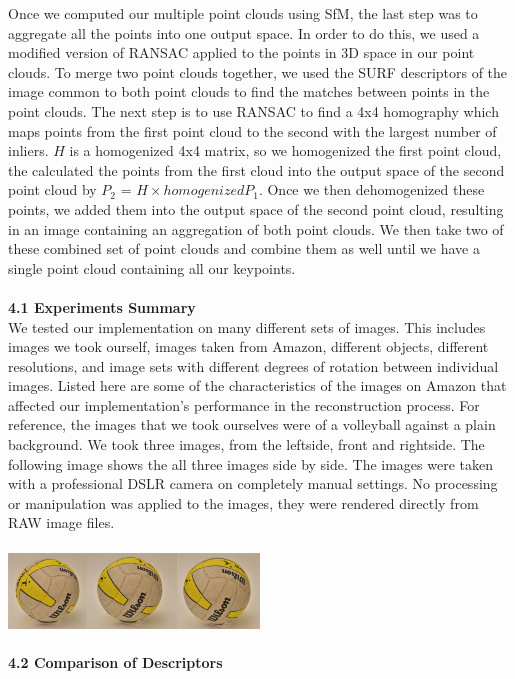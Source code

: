 \documentclass[12pt]{article}
\begin{document}
\begin{multicols}{2}
Once we computed our multiple point clouds using SfM, the last step was to aggregate all the points into one output space. In order to do this, we used a modified version of RANSAC applied to the points in 3D space in our point clouds. To merge two point clouds together, we used the SURF descriptors of the image common to both point clouds to find the matches between points in the point clouds. The next step is to use RANSAC to find a 4x4 homography which maps points from the first point cloud to the second with the largest number of inliers. $H$ is a homogenized 4x4 matrix, so we homogenized the first point cloud, the calculated the points from the first cloud into the output space of the second point cloud by $P_2$ = $H\times homogenizedP_1$. Once we then dehomogenized these points, we added them into the output space of the second point cloud, resulting in an image containing an aggregation of both point clouds. We then take two of these combined set of point clouds and combine them as well until we have a single point cloud containing all our keypoints.\\\\
{\large \textbf{4.1 Experiments Summary}}\\
We tested our implementation on many different sets of images. This includes images we took ourself, images taken from Amazon, different objects, different resolutions, and image sets with different degrees of rotation between individual images. Listed here are some of the characteristics of the images on Amazon that affected our implementation's performance in the reconstruction process. For reference, the images that we took ourselves were of a volleyball against a plain background. We took three images, from the leftside, front and rightside. The following image shows the all three images side by side. The images were taken with a professional DSLR camera on completely manual settings. No processing or manipulation was applied to the images, they were rendered directly from RAW image files.\\\\
\includegraphics[width=0.5\textwidth]{images/VBallSetof3.png}\\\\
{\large \textbf{4.2 Comparison of Descriptors}}\\

\end{multicols}
\end{document}
